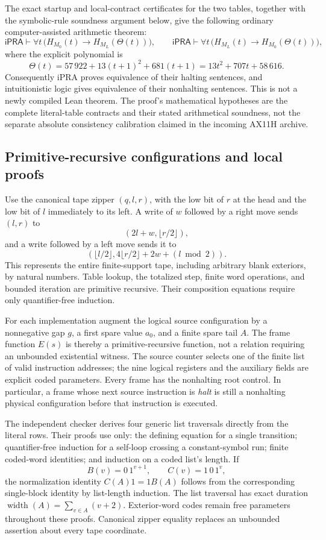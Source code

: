 The exact startup and local-contract certificates for the two tables,
together with the symbolic-rule soundness argument below, give the
following ordinary computer-assisted arithmetic theorem:
\[
 \mathsf{iPRA}\vdash\forall t\,
 \bigl(H_{M_0}(t)\longrightarrow H_{M_L}(\Theta(t))\bigr),
 \qquad
 \mathsf{iPRA}\vdash\forall t\,
 \bigl(H_{M_L}(t)\longrightarrow H_{M_0}(\Theta(t))\bigr),
 \tag{Q$_H$}\label{lcax:eq:quadratic-transfer}
\]
where the explicit polynomial is
\[
 \boxed{\Theta(t)=57\,922+13(t+1)^2+681(t+1)
              =13t^2+707t+58\,616.}
\]
Consequently iPRA proves equivalence of their halting sentences, and
intuitionistic logic gives equivalence of their nonhalting sentences.
This is not a newly compiled Lean theorem.  The proof's mathematical
hypotheses are the complete literal-table contracts and their stated
arithmetical soundness, not the separate absolute consistency
calibration claimed in the incoming AX11H archive.

\subsection{Primitive-recursive configurations and local proofs}

Use the canonical tape zipper $(q,l,r)$, with the low bit of $r$ at the
head and the low bit of $l$ immediately to its left.  A write of $w$ followed
by a right move sends $(l,r)$ to
\[
 (2l+w,\lfloor r/2\rfloor),
\]
and a write followed by a left move sends it to
\[
 (\lfloor l/2\rfloor,
   4\lfloor r/2\rfloor+2w+(l\bmod 2)).
\]
This represents the entire finite-support tape, including arbitrary blank
exteriors, by natural numbers.  Table lookup, the totalized step, finite
word operations, and bounded iteration are primitive recursive.  Their
composition equations require only quantifier-free induction.

For each implementation augment the logical source configuration by a
nonnegative gap $g$, a first spare value $a_0$, and a finite spare tail
$A$.  The frame function $E(s)$ is thereby a primitive-recursive function,
not a relation requiring an unbounded existential witness.  The source
counter selects one of the finite list of valid instruction addresses;
the nine logical registers and the auxiliary fields are explicit coded
parameters.  Every frame has the nonhalting root control.  In particular,
a frame whose next source instruction is \emph{halt} is still a
nonhalting physical configuration before that instruction is executed.

The independent checker derives four generic list traversals directly
from the literal rows.  Their proofs use only: the defining equation for a
single transition; quantifier-free induction for a self-loop crossing a
constant-symbol run; finite coded-word identities; and induction on a
coded list's length.  If
\[
 B(v)=0\,1^{v+1},\qquad C(v)=1\,0\,1^v,
\]
the normalization identity $C(A)1=1B(A)$ follows from the corresponding
single-block identity by list-length induction.  The list traversal has
exact duration $\operatorname{width}(A)=\sum_{v\in A}(v+2)$.
Exterior-word codes remain free parameters throughout these proofs.
Canonical zipper equality replaces an unbounded assertion about every
tape coordinate.

